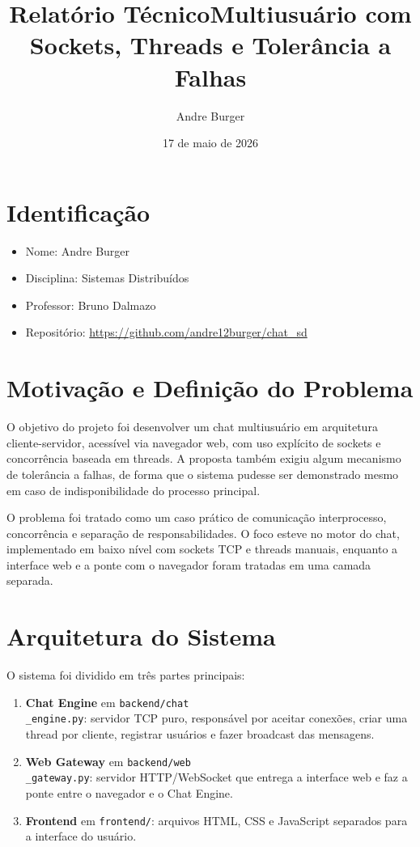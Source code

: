 \documentclass[12pt,a4paper]{article}
\title{Relatório Técnico\nChat Multiusuário com Sockets, Threads e Tolerância a Falhas}
\author{Andre Burger}
\date{17 de maio de 2026}
\begin{document}
\maketitle

\section{Identificação}

\begin{itemize}
    \item Nome: Andre Burger
    \item Disciplina: Sistemas Distribuídos
    \item Professor: Bruno Dalmazo
    \item Repositório: \url{https://github.com/andre12burger/chat_sd}
\end{itemize}

\section{Motivação e Definição do Problema}

O objetivo do projeto foi desenvolver um chat multiusuário em arquitetura cliente-servidor, acessível via navegador web, com uso explícito de sockets e concorrência baseada em threads. A proposta também exigiu algum mecanismo de tolerância a falhas, de forma que o sistema pudesse ser demonstrado mesmo em caso de indisponibilidade do processo principal.

O problema foi tratado como um caso prático de comunicação interprocesso, concorrência e separação de responsabilidades. O foco esteve no motor do chat, implementado em baixo nível com sockets TCP e threads manuais, enquanto a interface web e a ponte com o navegador foram tratadas em uma camada separada.

\section{Arquitetura do Sistema}

O sistema foi dividido em três partes principais:

\begin{enumerate}
    \item \textbf{Chat Engine} em \texttt{backend/chat\\_engine.py}: servidor TCP puro, responsável por aceitar conexões, criar uma thread por cliente, registrar usuários e fazer broadcast das mensagens.
    \item \textbf{Web Gateway} em \texttt{backend/web\\_gateway.py}: servidor HTTP/WebSocket que entrega a interface web e faz a ponte entre o navegador e o Chat Engine.
    \item \textbf{Frontend} em \texttt{frontend/}: arquivos HTML, CSS e JavaScript separados para a interface do usuário.
\end{enumerate}
\end{document}
